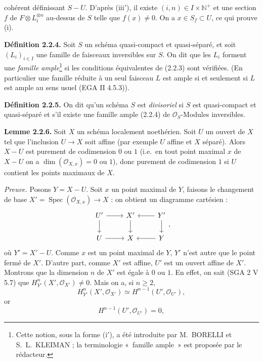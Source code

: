 cohérent
définissant $S-U$. D'après (iii$'$), il existe $(i,n)\in I\times\mathbb N^+$ et une section $f$ de $F\otimes L_i^{\otimes n}$ au-dessus de $S$ telle que $f(x)\ne0$. On a $x\in S_f\subset U$, ce qui prouve (i).

\textbf{Définition 2.2.4.} Soit $S$ un schéma quasi-compact et quasi-séparé, et soit $(L_i)_{i\in I}$ une famille de faisceaux inversibles sur $S$. On dit que les $L_i$ forment une \emph{famille ample}\footnote{Cette notion, sous la forme (i$'$), a été introduite par M.~BORELLI et S.~L.~KLEIMAN ; la terminologie «~famille ample~» est proposée par le rédacteur.} si les conditions équivalentes de (2.2.3) sont vérifiées. (En particulier une famille réduite à un seul faisceau $L$ est ample si et seulement si $L$ est ample au sens usuel (EGA II 4.5.3)).

\textbf{Définition 2.2.5.} On dit qu'un schéma $S$ est \emph{divisoriel} si $S$ est quasi-compact et quasi-séparé et s'il existe une famille ample (2.2.4) de $\mathcal O_S$-Modules inversibles.

\textbf{Lemme 2.2.6.} Soit $X$ un schéma localement noethérien. Soit $U$ un ouvert de $X$ tel que l'inclusion $U\to X$ soit affine (par exemple $U$ affine et $X$ séparé). Alors $X-U$ est purement de codimension $0$ ou $1$ (i.e.\ en tout point maximal $x$ de $X-U$ on a $\dim(\mathcal O_{X,x})=0$ ou $1$), donc purement de codimension $1$ si $U$ contient les points maximaux de $X$.

\emph{Preuve.} Posons $Y=X-U$. Soit $x$ un point maximal de $Y$, faisons le changement de base $X'=\operatorname{Spec}(\mathcal O_{X,x})\to X$ : on obtient un diagramme cartésien :
\[
\begin{tikzcd}
U' \arrow[r] \arrow[d] & X' \arrow[d] & Y' \arrow[l] \arrow[d] \\
U \arrow[r] & X & Y \arrow[l]
\end{tikzcd},
\]
où $Y'=X'-U$. Comme $x$ est un point maximal de $Y$, $Y'$ n'est autre que le point fermé de $X'$. D'autre part, comme $X'$ est affine, $U'$ est un ouvert affine de $X'$. Montrons que la dimension $n$ de $X'$ est égale à $0$ ou $1$. En effet, on sait (SGA 2 V 5.7) que $H^n_{Y'}(X',\mathcal O_{X'})\ne0$. Mais on a, si $n\ge2$,
\[
H^n_{Y'}(X',\mathcal O_{X'})\simeq H^{n-1}(U',\mathcal O_{U'}),
\]
or
\[
H^{n-1}(U',\mathcal O_{U'})=0,
\]
